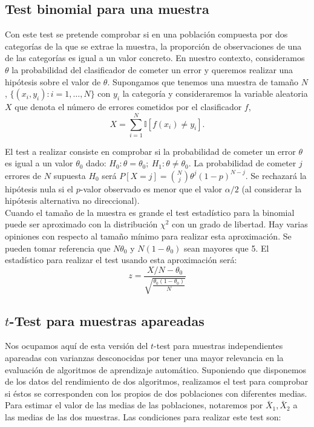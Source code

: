 \subsection{Test binomial para una muestra}

	Con este test se pretende comprobar si en una población
compuesta por dos categorías de la que se extrae la muestra, 
la proporción de observaciones de una de las categorías es 
igual a un valor concreto. En nuestro contexto, consideramos 
$\theta$ la probabilidad del clasificador de cometer un error 
y queremos realizar una hipótesis sobre el valor de $\theta$. 
Supongamos que tenemos una muestra de tamaño $N$, 
$\{(x_i, y_i): i = 1, \dots,N \}$ con $y_i$ la categoría y
consideraremos la variable aleatoria $X$ que denota el número
de errores cometidos por el clasificador $f$,
	\[ 
		X = \sum\limits_{i=1}^N 
				\mathbb{I}[f(x_i) \neq y_i].
	\]
	
	El test a realizar consiste en comprobar si la probabilidad de 
cometer un error $\theta$ es igual a un valor $\theta_0$
dado: $H_0: \theta = \theta_0;\ H_1: \theta \neq \theta_0$.
La probabilidad de cometer $j$ errores de $N$ supuesta $H_0$
será $P[X = j] = {N \choose j} \theta^j (1-p)^{N-j}$. Se 
rechazará la hipótesis nula si el $p$-valor observado 
es menor que el valor $\alpha/2$ (al considerar la hipótesis 
alternativa no direccional).\\
	Cuando el tamaño de la muestra es grande el test 
estadístico para la binomial puede ser aproximado con la 
distribución $\chi^2$ con un grado de libertad. Hay varias 
opiniones con respecto al tamaño mínimo para realizar
esta aproximación. Se pueden tomar referencia que 
$N \theta_0$ y $N (1 - \theta_0)$ sean mayores que 5. El 
estadístico para realizar el test usando esta 
aproximación será:
	\[
		z = \frac{X/N - \theta_0}
				{\sqrt{\frac{\theta_0(1 - \theta_0)}
							{N}}}
	\]
	
\subsection{$t$-Test para muestras apareadas}

	Nos ocupamos aquí de esta versión del $t$-test para 
muestras independientes apareadas con varianzas 
desconocidas por tener una mayor relevancia en la evaluación 
de algoritmos de aprendizaje automático. Suponiendo que 
disponemos de los datos del rendimiento de dos algoritmos, 
realizamos el test para comprobar si éstos se corresponden 
con los propios de dos poblaciones con diferentes medias. 
Para estimar el valor de las medias de las poblaciones, 
notaremos por $\bar{X}_1, \bar{X}_2$ a las medias de las dos 
muestras. Las condiciones para realizar este test son:
	
